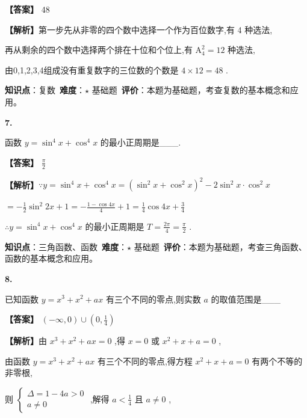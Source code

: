 \documentclass[10pt]{article}
\newenvironment{questionblock}[1]{%
  \needspace{3\baselineskip}%
  \noindent\textbf{#1.}%
}{%
  \par\vspace{1em}%
}
\begin{document}
\textbf{【答案】} 48

\textbf{【解析】}第一步先从非零的四个数中选择一个作为百位数字,有 4 种选法,

再从剩余的四个数中选择两个排在十位和个位上,有 \({\mathrm{A}}_{4}^{2} = {12}\) 种选法,

由0,1,2,3,4组成没有重复数字的三位数的个数是 \(4 \times  {12} = {48}\) .

\begin{analysisbox}[考点分析]
\textbf{知识点}：复数\
\textbf{难度}：$\star$ 基础题\
\textbf{评价}：本题为基础题，考查复数的基本概念和应用。
\end{analysisbox}

\begin{questionblock}{7}
函数 \(y = {\sin }^{4}x + {\cos }^{4}x\) 的最小正周期是___.
\end{questionblock}

\textbf{【答案】} \(\frac{\pi }{2}\)

\textbf{【解析】}\(\because y = {\sin }^{4}x + {\cos }^{4}x = {\left( {\sin }^{2}x + {\cos }^{2}x\right) }^{2} - 2{\sin }^{2}x \cdot  {\cos }^{2}x\)

\(=  - \frac{1}{2}{\sin }^{2}{2x} + 1 =  - \frac{1 - \cos {4x}}{4} + 1 = \frac{1}{4}\cos {4x} + \frac{3}{4}\)

\(\therefore y = {\sin }^{4}x + {\cos }^{4}x\) 的最小正周期是 \(T = \frac{2\pi }{4} = \frac{\pi }{2}\) .

\begin{analysisbox}[考点分析]
\textbf{知识点}：三角函数、函数\
\textbf{难度}：$\star$ 基础题\
\textbf{评价}：本题为基础题，考查三角函数、函数的基本概念和应用。
\end{analysisbox}

\begin{questionblock}{8}
已知函数 \(y = {x}^{3} + {x}^{2} + {ax}\) 有三个不同的零点,则实数 \(a\) 的取值范围是___
\end{questionblock}

\textbf{【答案】} \(\left( {-\infty ,0}\right)  \cup  \left( {0,\frac{1}{4}}\right)\)

\textbf{【解析】}由 \({x}^{3} + {x}^{2} + {ax} = 0\) ,得 \(x = 0\) 或 \({x}^{2} + x + a = 0\) ,

由函数 \(y = {x}^{3} + {x}^{2} + {ax}\) 有三个不同的零点,得方程 \({x}^{2} + x + a = 0\) 有两个不等的非零根,

则 \(\left\{  \begin{array}{l} \Delta  = 1 - {4a} > 0 \\  a \neq  0 \end{array}\right.\) ,解得 \(a < \frac{1}{4}\) 且 \(a \neq  0\) ,
\end{document}
